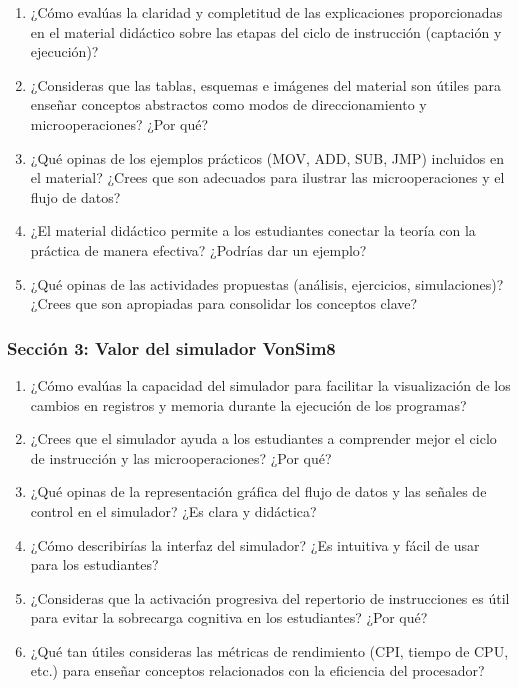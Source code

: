 \documentclass[12pt,oneside]{templates/unerthesis}
\begin{document}
\begin{enumerate}
\def\labelenumi{\arabic{enumi}.}
\setcounter{enumi}{3}
\item
  ¿Cómo evalúas la claridad y completitud de las explicaciones proporcionadas en el material didáctico sobre las etapas del ciclo de instrucción (captación y ejecución)?
\item
  ¿Consideras que las tablas, esquemas e imágenes del material son útiles para enseñar conceptos abstractos como modos de direccionamiento y microoperaciones? ¿Por qué?
\item
  ¿Qué opinas de los ejemplos prácticos (MOV, ADD, SUB, JMP) incluidos en el material? ¿Crees que son adecuados para ilustrar las microoperaciones y el flujo de datos?
\item
  ¿El material didáctico permite a los estudiantes conectar la teoría con la práctica de manera efectiva? ¿Podrías dar un ejemplo?
\item
  ¿Qué opinas de las actividades propuestas (análisis, ejercicios, simulaciones)? ¿Crees que son apropiadas para consolidar los conceptos clave?
\end{enumerate}

\hypertarget{secciuxf3n-3-valor-del-simulador-vonsim8-1}{%
\subsubsection{Sección 3: Valor del simulador VonSim8}\label{secciuxf3n-3-valor-del-simulador-vonsim8-1}}

\begin{enumerate}
\def\labelenumi{\arabic{enumi}.}
\setcounter{enumi}{8}
\item
  ¿Cómo evalúas la capacidad del simulador para facilitar la visualización de los cambios en registros y memoria durante la ejecución de los programas?
\item
  ¿Crees que el simulador ayuda a los estudiantes a comprender mejor el ciclo de instrucción y las microoperaciones? ¿Por qué?
\item
  ¿Qué opinas de la representación gráfica del flujo de datos y las señales de control en el simulador? ¿Es clara y didáctica?
\item
  ¿Cómo describirías la interfaz del simulador? ¿Es intuitiva y fácil de usar para los estudiantes?
\item
  ¿Consideras que la activación progresiva del repertorio de instrucciones es útil para evitar la sobrecarga cognitiva en los estudiantes? ¿Por qué?
\item
  ¿Qué tan útiles consideras las métricas de rendimiento (CPI, tiempo de CPU, etc.) para enseñar conceptos relacionados con la eficiencia del procesador?
\end{enumerate}
\end{document}
